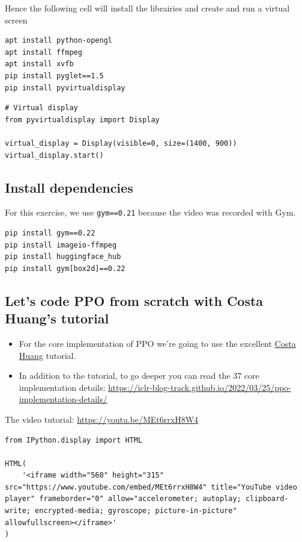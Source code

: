 \documentclass[11pt,a4paper]{article}
\begin{document}
Hence the following cell will install the librairies and create and run a virtual screen

\begin{lstlisting}
apt install python-opengl
apt install ffmpeg
apt install xvfb
pip install pyglet==1.5
pip install pyvirtualdisplay
\end{lstlisting}

\begin{lstlisting}
# Virtual display
from pyvirtualdisplay import Display

virtual_display = Display(visible=0, size=(1400, 900))
virtual_display.start()
\end{lstlisting}

\subsection{Install dependencies}\label{install-dependencies}

For this exercise, we use \texttt{gym==0.21} because the video was recorded with Gym.

\begin{lstlisting}
pip install gym==0.22
pip install imageio-ffmpeg
pip install huggingface_hub
pip install gym[box2d]==0.22
\end{lstlisting}

\subsection{Let's code PPO from scratch with Costa Huang's tutorial}\label{lets-code-ppo-from-scratch-with-costa-huangs-tutorial}

\begin{itemize}
\tightlist
\item
  For the core implementation of PPO we're going to use the excellent \href{https://costa.sh/}{Costa Huang} tutorial.
\item
  In addition to the tutorial, to go deeper you can read the 37 core implementation details: \url{https://iclr-blog-track.github.io/2022/03/25/ppo-implementation-details/}
\end{itemize}

The video tutorial: \url{https://youtu.be/MEt6rrxH8W4}

\begin{lstlisting}
from IPython.display import HTML

HTML(
    '<iframe width="560" height="315" src="https://www.youtube.com/embed/MEt6rrxH8W4" title="YouTube video player" frameborder="0" allow="accelerometer; autoplay; clipboard-write; encrypted-media; gyroscope; picture-in-picture" allowfullscreen></iframe>'
)
\end{lstlisting}
\end{document}
